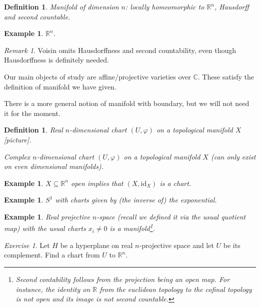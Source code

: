 \documentclass[12pt]{article}
\theoremstyle{darkgreentheorem}
\theoremstyle{darkbluedefinition}
\newtheorem{defn}[thm]{Definition}
\theoremstyle{darkredexample}
\newtheorem{exa}[thm]{Example}
\theoremstyle{remark}
\newtheorem{rem}[thm]{Remark}
\newtheorem{exe}[thm]{Exercise}
\newcommand{\R}{\mathbb{R}}
\newcommand{\1}{\mathbbm{1}}
\newcommand{\C}{\mathbb{C}}
\newcommand{\id}{\mathrm{id}}
\begin{document}
\begin{defn}
    Manifold of dimension $n$: locally homeomorphic to $\R^{n}$, Hausdorff and second countable.
\end{defn}

\begin{exa}
    $\R^{n}$.
\end{exa}

\begin{rem}
    Voisin omits Hausdorffness and second countability, even though Hausdorffness is definitely needed.
\end{rem}

Our main objects of study are affine/projective varieties over $\C$.
These satisfy the definition of manifold we have given.

There is a more general notion of manifold with boundary, but we will not need it for the moment.

\begin{defn}
    Real $n$-dimensional chart $(U,\varphi)$ on a topological manifold $X$ [picture].

    Complex $n$-dimensional chart $(U,\varphi)$ on a topological manifold $X$ (can only exist on even dimensional manifolds).
\end{defn}

\begin{exa}
    $X\subseteq \R^{n}$ open implies that $(X,\id_{X})$ is a chart.
\end{exa}

\begin{exa}
    $S^{1}$ with charts given by (the inverse of) the exponential.
\end{exa}

\begin{exa}
    Real projective $n$-space (recall we defined it via the usual quotient map) with the usual charts $x_{i}\neq 0$ is a manifold\footnote{Second contability follows from the projection being an open map. For instance, the identity on $\R$ from the euclidean topology to the cofinal topology is not open and its image is not second countable.}.
\end{exa}

\begin{exe}
    Let $H$ be a hyperplane on real $n$-projective space and let $U$ be its complement.
    Find a chart from $U$ to $\R^{n}$.
\end{exe}
\end{document}
